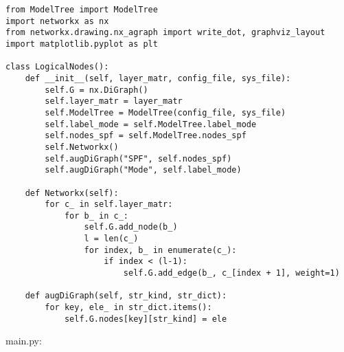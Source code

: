 \begin{verbatim}
from ModelTree import ModelTree
import networkx as nx
from networkx.drawing.nx_agraph import write_dot, graphviz_layout
import matplotlib.pyplot as plt

class LogicalNodes():
    def __init__(self, layer_matr, config_file, sys_file):
        self.G = nx.DiGraph()
        self.layer_matr = layer_matr
        self.ModelTree = ModelTree(config_file, sys_file)
        self.label_mode = self.ModelTree.label_mode
        self.nodes_spf = self.ModelTree.nodes_spf
        self.Networkx()
        self.augDiGraph("SPF", self.nodes_spf)
        self.augDiGraph("Mode", self.label_mode)

    def Networkx(self):
        for c_ in self.layer_matr:
            for b_ in c_:
                self.G.add_node(b_)
                l = len(c_)
                for index, b_ in enumerate(c_):
                    if index < (l-1):
                        self.G.add_edge(b_, c_[index + 1], weight=1)

    def augDiGraph(self, str_kind, str_dict):
        for key, ele_ in str_dict.items():
            self.G.nodes[key][str_kind] = ele
\end{verbatim}

main.py:

